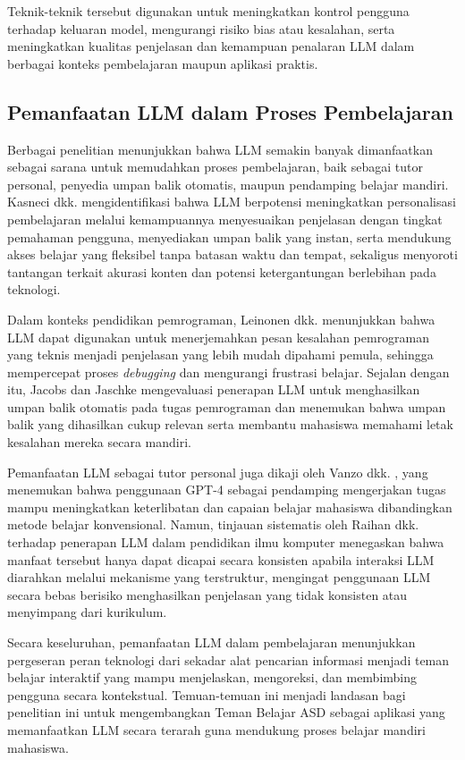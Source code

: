 Teknik-teknik tersebut digunakan untuk meningkatkan kontrol pengguna terhadap keluaran model, mengurangi risiko bias atau kesalahan, serta meningkatkan kualitas penjelasan dan kemampuan penalaran LLM dalam berbagai konteks pembelajaran maupun aplikasi praktis.

\subsection{Pemanfaatan LLM dalam Proses Pembelajaran}

Berbagai penelitian menunjukkan bahwa LLM semakin banyak dimanfaatkan sebagai sarana untuk memudahkan proses pembelajaran, baik sebagai tutor personal, penyedia umpan balik otomatis, maupun pendamping belajar mandiri. Kasneci dkk. \cite{Kasneci2023} mengidentifikasi bahwa LLM berpotensi meningkatkan personalisasi pembelajaran melalui kemampuannya menyesuaikan penjelasan dengan tingkat pemahaman pengguna, menyediakan umpan balik yang instan, serta mendukung akses belajar yang fleksibel tanpa batasan waktu dan tempat, sekaligus menyoroti tantangan terkait akurasi konten dan potensi ketergantungan berlebihan pada teknologi.

Dalam konteks pendidikan pemrograman, Leinonen dkk. \cite{Leinonen2023} menunjukkan bahwa LLM dapat digunakan untuk menerjemahkan pesan kesalahan pemrograman yang teknis menjadi penjelasan yang lebih mudah dipahami pemula, sehingga mempercepat proses \textit{debugging} dan mengurangi frustrasi belajar. Sejalan dengan itu, Jacobs dan Jaschke \cite{Jacobs2024LLMFeedbackProgramming} mengevaluasi penerapan LLM untuk menghasilkan umpan balik otomatis pada tugas pemrograman dan menemukan bahwa umpan balik yang dihasilkan cukup relevan serta membantu mahasiswa memahami letak kesalahan mereka secara mandiri.

Pemanfaatan LLM sebagai tutor personal juga dikaji oleh Vanzo dkk. \cite{Vanzo2024GPT4HomeworkTutor}, yang menemukan bahwa penggunaan GPT-4 sebagai pendamping mengerjakan tugas mampu meningkatkan keterlibatan dan capaian belajar mahasiswa dibandingkan metode belajar konvensional. Namun, tinjauan sistematis oleh Raihan dkk. \cite{Raihan2024} terhadap penerapan LLM dalam pendidikan ilmu komputer menegaskan bahwa manfaat tersebut hanya dapat dicapai secara konsisten apabila interaksi LLM diarahkan melalui mekanisme yang terstruktur, mengingat penggunaan LLM secara bebas berisiko menghasilkan penjelasan yang tidak konsisten atau menyimpang dari kurikulum.

Secara keseluruhan, pemanfaatan LLM dalam pembelajaran menunjukkan pergeseran peran teknologi dari sekadar alat pencarian informasi menjadi teman belajar interaktif yang mampu menjelaskan, mengoreksi, dan membimbing pengguna secara kontekstual. Temuan-temuan ini menjadi landasan bagi penelitian ini untuk mengembangkan Teman Belajar ASD sebagai aplikasi yang memanfaatkan LLM secara terarah guna mendukung proses belajar mandiri mahasiswa.

